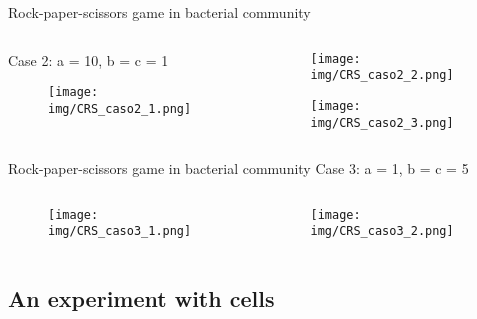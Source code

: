 \begin{frame}{Rock-paper-scissors game in bacterial community}

	\begin{columns}
		\begin{column}{0.5\textwidth}
		Case 2: a = 10,  b = c = 1
			\begin{figure}
				\texttt{[image: img/CRS\_caso2\_1.png]}			
			\end{figure}
		\end{column}

		\begin{column}{0.5\textwidth}
			\begin{figure}
				\texttt{[image: img/CRS\_caso2\_2.png]}			
			\end{figure}
			\begin{figure}
				\texttt{[image: img/CRS\_caso2\_3.png]}			
			\end{figure}
		\end{column}
	\end{columns}
\end{frame}

\begin{frame}{Rock-paper-scissors game in bacterial community}
Case 3: a = 1,  b = c = 5
	\begin{columns}
		\begin{column}{0.5\textwidth}
			\begin{figure}
				\texttt{[image: img/CRS\_caso3\_1.png]}			
			\end{figure}
		\end{column}

		\begin{column}{0.5\textwidth}
			\begin{figure}
				\texttt{[image: img/CRS\_caso3\_2.png]}			
			\end{figure}
		\end{column}
	\end{columns}
\end{frame}

\subsection{An experiment with cells}

